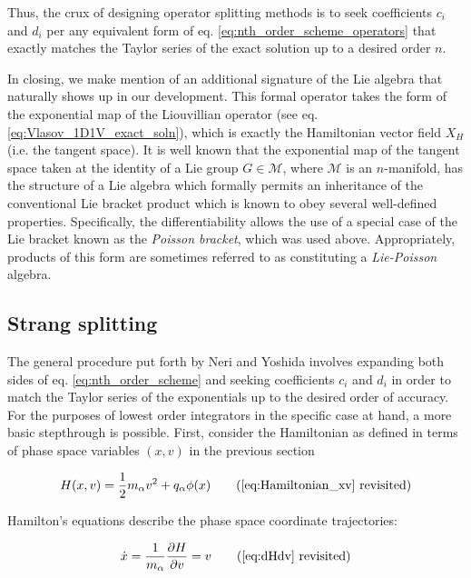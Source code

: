 \documentclass[11pt,titlepage]{report}
\begin{document}
\noindent Thus, the crux of designing operator splitting methods is to seek coefficients $c_i$ and $d_i$ per any equivalent form of eq. \eqref{eq:nth_order_scheme_operators} that exactly matches the Taylor series of the exact solution up to a desired order $n$.

In closing, we make mention of an additional signature of the Lie algebra that naturally shows up in our development. This formal operator takes the form of the exponential map of the Liouvillian operator (see eq. \eqref{eq:Vlasov_1D1V_exact_soln}), which is exactly the Hamiltonian vector field $X_H$ (i.e. the tangent space). It is well known that the exponential map of the tangent space taken at the identity of a Lie group $G\in\mathcal{M}$, where $\mathcal{M}$ is an $n$-manifold, has the structure of a Lie algebra which formally permits an inheritance of the conventional Lie bracket product which is known to obey several well-defined properties. Specifically, the differentiability allows the use of a special case of the Lie bracket known as the \emph{Poisson bracket}, which was used above. Appropriately, products of this form are sometimes referred to as constituting a \emph{Lie-Poisson} algebra.

\subsection{Strang splitting} \label{subsec:Strang_splitting}

\indent\indent The general procedure put forth by Neri \cite{Neri87} and Yoshida \cite{Yoshida90} involves expanding both sides of eq. \eqref{eq:nth_order_scheme} and seeking coefficients $c_i$ and $d_i$ in order to match the Taylor series of the exponentials up to the desired order of accuracy. For the purposes of lowest order integrators in the specific case at hand, a more basic stepthrough is possible. First, consider the Hamiltonian as defined in terms of phase space variables $(x,v)$ in the previous section

\begin{equation*}
H(x,v) = \frac{1}{2}m_{\alpha}v^2 + q_{\alpha}\phi (x) \tag{\ref{eq:Hamiltonian_xv} revisited}
\end{equation*}

\noindent Hamilton's equations describe the phase space coordinate trajectories:

\begin{equation*}
\dot{x} =  \frac{1}{m_{\alpha}}\frac{\partial H}{\partial v} = v \tag{\ref{eq:dHdv} revisited}
\end{equation*}
\end{document}
